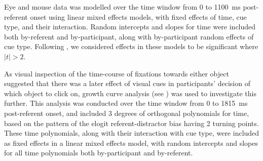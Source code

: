 \documentclass[a4paper,man,natbib]{apa6}
\begin{document}
Eye and mouse data was modelled over the time window from 0 to 1100~ms post-referent onset using linear mixed effects models, with fixed effects of time, cue type, and their interaction.
Random intercepts and slopes for time were included both by-referent and by-participant, along with by-participant random effects of cue type.
Following \citet{Baayen2008}, we considered effects in these models to be significant where $|t|>2$.

As visual inspection of the time-course of fixations towards either object suggested that there was a later effect of visual cues in participants' decision of which object to click on, growth curve analysis (see \citealt{Mirman2008}) was used to investigate this further. 
This analysis was conducted over the time window from 0 to 1815~ms post-referent onset, and included 3 degrees of orthogonal polynomials for time, based on the pattern of the elogit referent-distractor bias having 2 turning points. 
These time polynomials, along with their interaction with cue type, were included as fixed effects in a linear mixed effects model, with random intercepts and slopes for all time polynomials both by-participant and by-referent.
\end{document}
